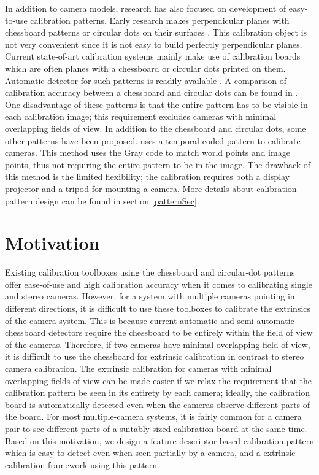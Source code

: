 \documentclass{report}
\begin{document}
In addition to camera models, research has also focused on development of easy-to-use calibration patterns. Early research makes perpendicular planes with chessboard patterns or circular dots on their surfaces \cite{bouguet2004camera}. This calibration object is not very convenient since it is not easy to build perfectly perpendicular planes. Current state-of-art calibration systems mainly make use of calibration boards which are often planes with a chessboard or circular dots printed on them. Automatic detector for such patterns is readily available \cite{opencv_library, rufli2008automatic, geiger2012automatic}. A comparison of calibration accuracy between a chessboard and circular dots can be found in \cite{mallon2007pattern}. One disadvantage of these patterns is that the entire pattern has to be visible in each calibration image; this requirement excludes cameras with minimal overlapping fields of view. In addition to the chessboard and circular dots, some other patterns have been proposed. \cite{schmalz2011camera} uses a temporal coded pattern to calibrate cameras. This method uses the Gray code to match world points and image points, thus not requiring the entire pattern to be in the image. The drawback of this method is the limited flexibility; the calibration requires both a display projector and a tripod for mounting a camera. More details about calibration pattern design can be found in section \ref{patternSec}. 

\section{Motivation}
\label{motiveSec}
Existing calibration toolboxes using the chessboard and circular-dot patterns offer ease-of-use and high calibration accuracy when it comes to calibrating single and stereo cameras. However, for a system with multiple cameras pointing in different directions, it is difficult to use these toolboxes to calibrate the extrinsics of the camera system. This is because current automatic and semi-automatic chessboard detectors require the chessboard to be entirely within the field of view of the cameras. Therefore, if two cameras have minimal overlapping field of view, it is difficult to use the chessboard for extrinsic calibration in contrast to stereo camera calibration. The extrinsic calibration for cameras with minimal overlapping fields of view can be made easier if we relax the requirement that the calibration pattern be seen in its entirety by each camera; ideally, the calibration board is automatically detected even when the cameras observe different parts of the board. For most multiple-camera systems, it is fairly common for a camera pair to see different parts of a suitably-sized calibration board at the same time. Based on this motivation, we design a feature descriptor-based calibration pattern which is easy to detect even when seen partially by a camera, and a extrinsic calibration framework using this pattern. 
\end{document}
